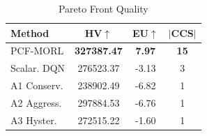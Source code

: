 \begin{table}[t]
\centering
\caption{Pareto Front Quality}
\label{tab:pareto}
\begin{tabular}{lccc}
\toprule
Method & HV$\uparrow$ & EU$\uparrow$ & $|$CCS$|$ \\
\midrule
PCF-MORL & \textbf{327387.47} & \textbf{7.97} & \textbf{15} \\
Scalar. DQN & 276523.37 & -3.13 & 3 \\
A1 Conserv. & 238902.49 & -6.82 & 1 \\
A2 Aggress. & 297884.53 & -6.76 & 1 \\
A3 Hyster. & 272515.22 & -1.60 & 1 \\
\bottomrule
\end{tabular}
\end{table}